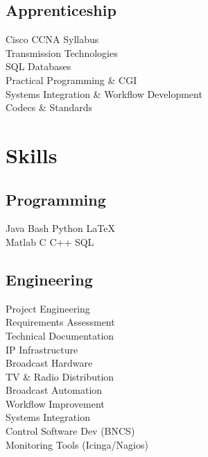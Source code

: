 \documentclass[]{deedy-resume-openfont}
\begin{document}
\begin{minipage}[t]{0.33\textwidth}
\subsection{Apprenticeship}
Cisco CCNA Syllabus \\
Transmission Technologies \\
SQL Databases \\
Practical Programming \& CGI\\
Systems Integration \& Workflow Development \\
Codecs \& Standards \\
\sectionsep


\section{Skills}
\subsection{Programming}
Java \textbullet{} Bash \textbullet{} Python \textbullet{} LaTeX\ \\ 
Matlab \textbullet{} C \textbullet{} C++ \textbullet{} SQL \\
\sectionsep

\subsection{Engineering}
Project Engineering \\
Requirements Assessment \\ 
Technical Documentation \\
IP Infrastructure \\
Broadcast Hardware \\
TV \& Radio Distribution \\
Broadcast Automation \\
Workflow Improvement \\
Systems Integration \\
Control Software Dev (BNCS) \\
Monitoring Tools (Icinga/Nagios)\\

%
%

\end{minipage} 
\end{document}

